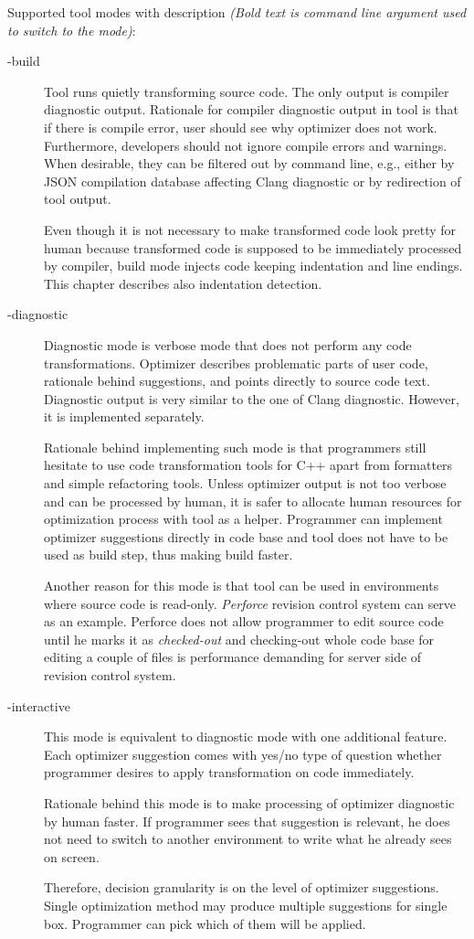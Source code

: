 Supported tool modes with description \textit{(Bold text is command line argument used to switch to the mode)}:
\begin{description}
\item[-build]{
Tool runs quietly transforming source code. The only output is compiler diagnostic output. Rationale for compiler diagnostic output in tool is that if there is compile error, user should see why optimizer does not work. Furthermore, developers should not ignore compile errors and warnings. When desirable, they can be filtered out by command line, e.g., either by JSON compilation database affecting Clang diagnostic or by redirection of tool output.

Even though it is not necessary to make transformed code look pretty for human because transformed code is supposed to be immediately processed by compiler, build mode injects code keeping indentation and line endings. This chapter describes also indentation detection.
}
\item[-diagnostic]{
Diagnostic mode is verbose mode that does not perform any code transformations. Optimizer describes problematic parts of user code, rationale behind suggestions, and points directly to source code text. Diagnostic output is very similar to the one of Clang diagnostic. However, it is implemented separately.

Rationale behind implementing such mode is that programmers still hesitate to use code transformation tools for C++ apart from formatters and simple refactoring tools. Unless optimizer output is not too verbose and can be processed by human, it is safer to allocate human resources for optimization process with tool as a helper. Programmer can implement optimizer suggestions directly in code base and tool does not have to be used as build step, thus making build faster.

Another reason for this mode is that tool can be used in environments where source code is read-only. \emph{Perforce} revision control system can serve as an example. Perforce does not allow programmer to edit source code until he marks it as \emph{checked-out} and checking-out whole code base for editing a couple of files is performance demanding for server side of revision control system.
}
\item[-interactive]{
This mode is equivalent to diagnostic mode with one additional feature. Each optimizer suggestion comes with yes/no type of question whether programmer desires to apply transformation on code immediately.

Rationale behind this mode is to make processing of optimizer diagnostic by human faster. If programmer sees that suggestion is relevant, he does not need to switch to another environment to write what he already sees on screen.

Therefore, decision granularity is on the level of optimizer suggestions. Single optimization method may produce multiple suggestions for single box. Programmer can pick which of them will be applied.
}
\end{description}

